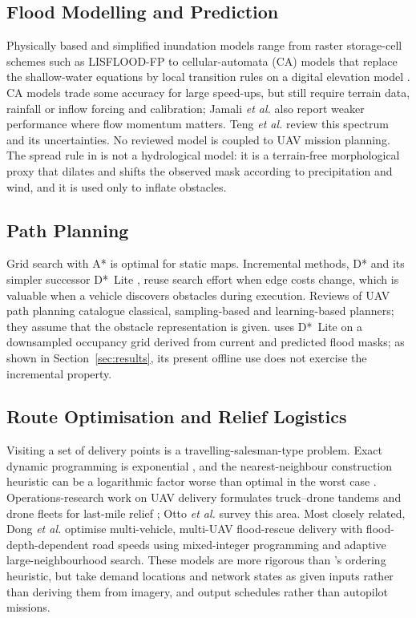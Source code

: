 \subsection{Flood Modelling and Prediction}
Physically based and simplified inundation models range from raster storage-cell schemes such as LISFLOOD-FP \cite{bates2000simple} to cellular-automata (CA) models that replace the shallow-water equations by local transition rules on a digital elevation model \cite{ghimire2013formulation,guidolin2016weighted,jamali2019cellular}. CA models trade some accuracy for large speed-ups, but still require terrain data, rainfall or inflow forcing and calibration; Jamali \emph{et al.} \cite{jamali2019cellular} also report weaker performance where flow momentum matters. Teng \emph{et al.} \cite{teng2017flood} review this spectrum and its uncertainties. No reviewed model is coupled to UAV mission planning. The spread rule in \adapt{} is not a hydrological model: it is a terrain-free morphological proxy that dilates and shifts the observed mask according to precipitation and wind, and it is used only to inflate obstacles.

\subsection{Path Planning}
Grid search with A* \cite{hart1968formal} is optimal for static maps. Incremental methods, D* \cite{stentz1994optimal} and its simpler successor D*~Lite \cite{koenig2002dstar,koenig2005fast}, reuse search effort when edge costs change, which is valuable when a vehicle discovers obstacles during execution. Reviews of UAV path planning \cite{aggarwal2020path} catalogue classical, sampling-based and learning-based planners; they assume that the obstacle representation is given. \adapt{} uses D*~Lite on a downsampled occupancy grid derived from current and predicted flood masks; as shown in Section~\ref{sec:results}, its present offline use does not exercise the incremental property.

\subsection{Route Optimisation and Relief Logistics}
Visiting a set of delivery points is a travelling-salesman-type problem. Exact dynamic programming is exponential \cite{held1962dynamic}, and the nearest-neighbour construction heuristic can be a logarithmic factor worse than optimal in the worst case \cite{rosenkrantz1977analysis}. Operations-research work on UAV delivery formulates truck--drone tandems \cite{murray2015flying} and drone fleets for last-mile relief \cite{rabta2018drone}; Otto \emph{et al.} \cite{otto2018optimization} survey this area. Most closely related, Dong \emph{et al.} \cite{dong2026path} optimise multi-vehicle, multi-UAV flood-rescue delivery with flood-depth-dependent road speeds using mixed-integer programming and adaptive large-neighbourhood search. These models are more rigorous than \adapt{}'s ordering heuristic, but take demand locations and network states as given inputs rather than deriving them from imagery, and output schedules rather than autopilot missions.

